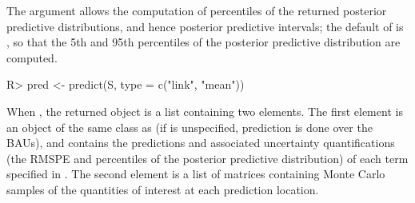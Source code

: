 \documentclass[article]{jss}
\begin{document}
The  argument allows the computation of percentiles of the returned posterior predictive distributions, and hence posterior predictive intervals; the default of  is , so that the 5th and 95th percentiles of the posterior predictive distribution are computed.
\begin{Code}
R> pred <- predict(S, type = c("link", "mean"))
\end{Code}
When , the returned object is a list containing two elements. 
The first element is an object of the same class as  (if  is unspecified, prediction is done over the BAUs), and contains the predictions and associated uncertainty quantifications (the RMSPE and percentiles of the posterior predictive distribution) of each term specified in .
The second element is a list of matrices containing Monte Carlo samples of the quantities of interest at each prediction location. 
\end{document}
